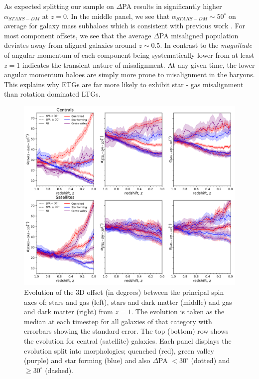 \documentclass[fleqn,usenatbib]{mnras}
\begin{document}
As expected splitting our sample on $\Delta$PA results in significantly higher $\alpha_{STARS - DM}$ at $z = 0$. In the middle panel, we see that $\alpha_{STARS - DM} \sim 50^{\circ}$ on average for galaxy mass subhaloes which is consistent with previous work \citep[e.g. see;][]{chisari+17}. For most component offsets, we see that the average $\Delta$PA misaligned population deviates away from aligned galaxies around $z \sim 0.5$. In contrast to the \textit{magnitude} of angular momentum of each component being systematically lower from at least $z = 1$ indicates the transient nature of misalignment. At any given time, the lower angular momentum haloes are simply more prone to misalignment in the baryons. This explains why ETGs are far more likely to exhibit star - gas misalignment than rotation dominated LTGs. 

\begin{figure}
	\includegraphics[width=\linewidth]{tng_results/3D_pa_evo_cen_sat.pdf}
    \caption{Evolution of the 3D offset (in degrees) between the principal spin axes of; stars and gas (left), stars and dark matter (middle) and gas and dark matter (right) from $z=1$. The evolution is taken as the median at each timestep for all galaxies of that category with errorbars showing the standard error. The top (bottom) row shows the evolution for central (satellite) galaxies. Each panel displays the evolution split into morphologies; quenched (red), green valley (purple) and star forming (blue) and also $\Delta$PA $< 30^{\circ}$ (dotted) and $\geq 30^{\circ}$ (dashed).}
    \label{fig:3D_alpha_evo}
\end{figure}
\end{document}
